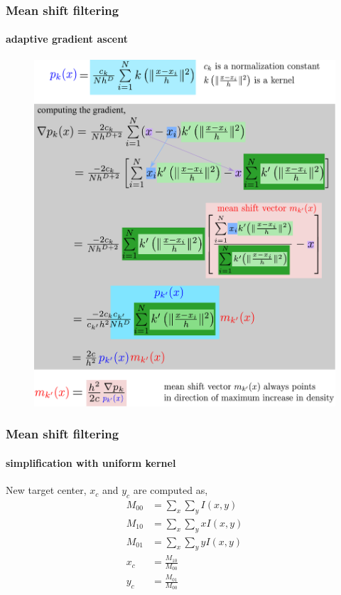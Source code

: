 \begin{frame}
\frametitle{Mean shift filtering}
\framesubtitle{adaptive gradient ascent}
\logoCSIPCPL\mypagenum
	\begin{figure}				
		\includegraphics[height=.85\textheight]{figs/PRML_meanShift.pdf}
	\end{figure}
\end{frame}





\begin{frame}
\frametitle{Mean shift filtering}
\framesubtitle{simplification with uniform kernel}
\logoCSIPCPL\mypagenum
	New target center, $x_c$ and $y_c$ are computed as,
	\begin{align*}
		\label{eq:MeanShiftEquations}
		M_{00}&=\sum_x\sum_yI(x,y)		\\
		M_{10}&=\sum_x\sum_yxI(x,y)		\\
		M_{01}&=\sum_x\sum_yyI(x,y)		\\
		x_c&=\frac{M_{10}}{M_{00}}		\\
		y_c&=\frac{M_{01}}{M_{00}}
	\end{align*}
\end{frame}



